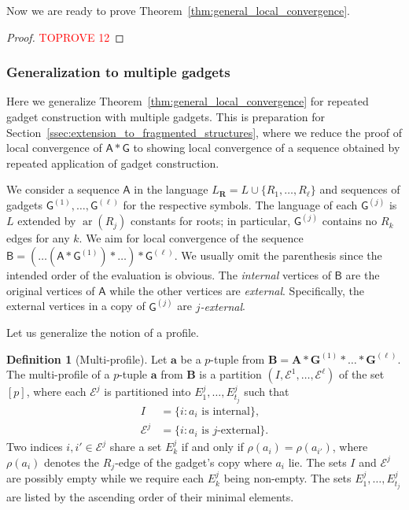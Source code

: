 \documentclass[11pt]{article}
\theoremstyle{plain}
\theoremstyle{definition}
\newtheorem{definition}{Definition}
\theoremstyle{remark}
\DeclareMathOperator\aritysym{ar}
\newcommand{\arity}[1]{{\aritysym({#1})}}
\newcommand{\str}[1]{\mathbf{#1}}
\newcommand{\strseq}[1]{{\boldsymbol{\mathsf{#1}}}}
\newcommand{\tpl}[1]{{\bm{#1}}}
\begin{document}
Now we are ready to prove Theorem~\ref{thm:general_local_convergence}.

\begin{proof}\textcolor{red}{TOPROVE 12}\end{proof}

\subsubsection{Generalization to multiple gadgets}\label{sssec:multiple_gadgets}

Here we generalize Theorem~\ref{thm:general_local_convergence} for repeated gadget construction with multiple gadgets.
This is preparation for Section~\ref{ssec:extension_to_fragmented_structures}, where we reduce the proof of local convergence of $\strseq{A}*\strseq{G}$ to showing local convergence of a sequence obtained by repeated application of gadget construction.

We consider a sequence $\strseq{A}$ in the language $L_\tpl{R} = L \cup \{R_1, \dots, R_\ell\}$ and sequences of gadgets $\strseq{G}^{(1)}, \dots, \strseq{G}^{(\ell)}$ for the respective symbols.
The language of each $\strseq{G}^{(j)}$ is $L$ extended by $\arity{R_j}$ constants for roots; in particular, $\strseq{G}^{(j)}$ contains no $R_k$ edges for any $k$.
We aim for local convergence of the sequence $\strseq{B} = (\dots(\strseq{A}*\strseq{G}^{(1)}) * \dots ) *\strseq{G}^{(\ell)}$.
We usually omit the parenthesis since the intended order of the evaluation is obvious.
The \emph{internal} vertices of $\strseq{B}$ are the original vertices of $\strseq{A}$ while the other vertices are \emph{external}.
Specifically, the external vertices in a copy of $\strseq{G}^{(j)}$ are \emph{$j$-external}.

Let us generalize the notion of a profile.

\begin{definition}[Multi-profile]
    Let $\tpl{a}$ be a $p$-tuple from $\str{B} = \str{A}*\str{G}^{(1)}* \dots * \str{G}^{(\ell)}$.
    The multi-profile of a $p$-tuple $\tpl{a}$ from $\str{B}$ is a partition $(I, \mathcal{E}^1, \dots, \mathcal{E}^\ell)$ of the set $[p]$, where each $\mathcal{E}^j$ is partitioned into $E^j_1, \dots, E^j_{t_j}$ such that
    \begin{align*}
        I             &= \{i : a_i\text{ is internal}\}
        , \\
        \mathcal{E}^j &= \{i : a_i\text{ is $j$-external}\}
        .
    \end{align*}
    Two indices $i,i' \in \mathcal{E}^j$ share a set $E^j_k$ if and only if $\rho(a_i) = \rho(a_{i'})$, where $\rho(a_i)$ denotes the $R_j$-edge of the gadget's copy where $a_i$ lie.
    The sets $I$ and $\mathcal{E}^j$ are possibly empty while we require each $E^j_k$ being non-empty.
    The sets $E^j_1, \dots, E^j_{t_j}$ are listed by the ascending order of their minimal elements.
\end{definition}
\end{document}
